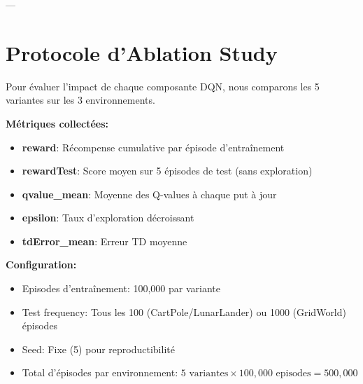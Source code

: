 ---

\section{Protocole d'Ablation Study}

Pour évaluer l'impact de chaque composante DQN, nous comparons les 5 variantes sur les 3 environnements.

\textbf{Métriques collectées:}
\begin{itemize}
    \item \textbf{reward}: Récompense cumulative par épisode d'entraînement
    \item \textbf{rewardTest}: Score moyen sur 5 épisodes de test (sans exploration)
    \item \textbf{qvalue\_mean}: Moyenne des Q-values à chaque put à jour
    \item \textbf{epsilon}: Taux d'exploration décroissant
    \item \textbf{tdError\_mean}: Erreur TD moyenne
\end{itemize}

\textbf{Configuration:}
\begin{itemize}
    \item Episodes d'entraînement: 100,000 par variante
    \item Test frequency: Tous les 100 (CartPole/LunarLander) ou 1000 (GridWorld) épisodes
    \item Seed: Fixe (5) pour reproductibilité
    \item Total d'épisodes par environnement: $5 \text{ variantes} \times 100,000 \text{ episodes} = 500,000$
\end{itemize}
